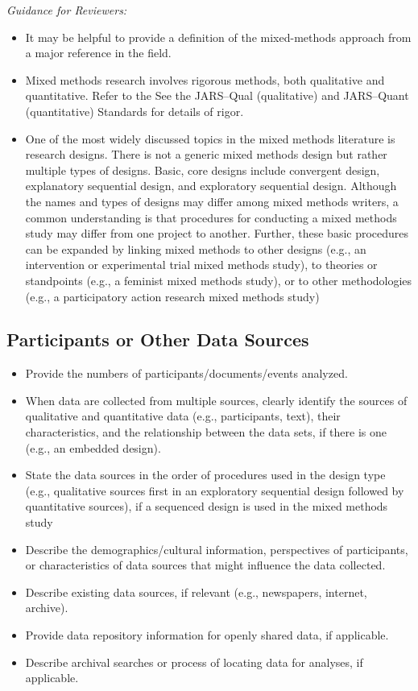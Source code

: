 \documentclass[acmsmall]{acmart}
\begin{document}
\textit{Guidance for Reviewers:}
\begin{itemize}
\item It may be helpful to provide a definition of the mixed-methods approach from a major reference in the field.
\item Mixed methods research involves rigorous methods, both qualitative and quantitative. Refer to the See the JARS–Qual (qualitative) and JARS–Quant (quantitative) Standards for details of rigor.
\item One of the most widely discussed topics in the mixed methods literature is research designs. There is not a generic mixed methods design but rather multiple types of designs. Basic, core designs include convergent design, explanatory sequential design, and exploratory sequential design. Although the names and types of designs may differ among mixed methods writers, a common understanding is that procedures for conducting a mixed methods study may differ from one project to another. Further, these basic procedures can be expanded by linking mixed methods to other designs (e.g., an intervention or experimental trial mixed methods study), to theories or standpoints (e.g., a feminist mixed methods study), or to other methodologies (e.g., a participatory action research mixed methods study)
\end{itemize}


\subsection{Participants or Other Data Sources}

\begin{itemize}
\item Provide the numbers of participants/documents/events analyzed.
\item When data are collected from multiple sources, clearly identify the sources of qualitative and quantitative data (e.g., participants, text), their characteristics, and the relationship between the data sets, if there is one (e.g., an embedded design).
\item State the data sources in the order of procedures used in the design type (e.g., qualitative sources first in an exploratory sequential design followed by quantitative sources), if a sequenced design is used in the mixed methods study
\item Describe the demographics/cultural information, perspectives of participants, or characteristics of data sources that might influence the data collected.
\item Describe existing data sources, if relevant (e.g., newspapers, internet, archive).
\item Provide data repository information for openly shared data, if applicable.
\item Describe archival searches or process of locating data for analyses, if applicable.
\end{itemize}
\end{document}
